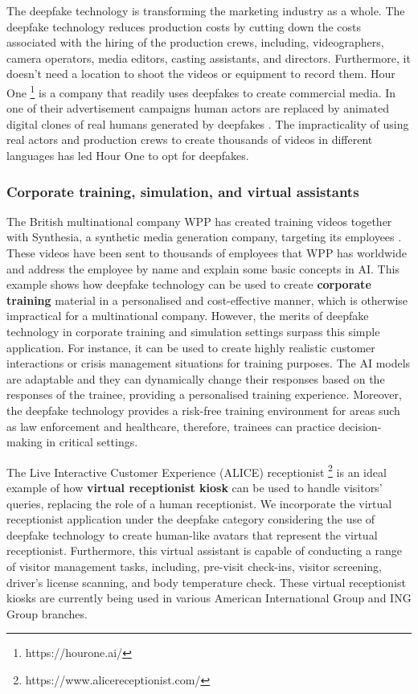 The deepfake technology is transforming the marketing industry as a whole. The deepfake technology reduces production costs by cutting down the costs associated with the hiring of the production crews, including, videographers, camera operators, media editors, casting assistants, and directors. Furthermore, it doesn't need a location to shoot the videos or equipment to record them. Hour One \footnote{https://hourone.ai/} is a company that readily uses deepfakes to create commercial media. In one of their advertisement campaigns human actors are replaced by animated digital clones of real humans generated by deepfakes \cite{deepfaketechnologyreview}. The impracticality of using real actors and production crews to create thousands of videos in different languages has led Hour One to opt for deepfakes.

\subsubsection{Corporate training, simulation, and virtual assistants}

The British multinational company WPP has created training videos together with Synthesia, a synthetic media generation company, targeting its employees \cite{deepfakewired}. These videos have been sent to thousands of employees that WPP has worldwide and address the employee by name and explain some basic concepts in AI. This example shows how deepfake technology can be used to create \textbf{corporate training} material in a personalised and cost-effective manner, which is otherwise impractical for a multinational company. However, the merits of deepfake technology in corporate training and simulation settings surpass this simple application. For instance, it can be used to create highly realistic customer interactions or crisis management situations for training purposes. The AI models are adaptable and they can dynamically change their responses based on the responses of the trainee, providing a personalised training experience. Moreover, the deepfake technology provides a risk-free training environment for areas such as law enforcement and healthcare, therefore, trainees can practice decision-making in critical settings.  

The Live Interactive Customer Experience (ALICE) receptionist \footnote{https://www.alicereceptionist.com/} is an ideal example of how \textbf{virtual receptionist kiosk} can be used to handle visitors' queries, replacing the role of a human receptionist. We incorporate the virtual receptionist application under the deepfake category considering the use of deepfake technology to create human-like avatars that represent the virtual receptionist. Furthermore, this virtual assistant is capable of conducting a range of visitor management tasks, including, pre-visit check-ins, visitor screening, driver's license scanning, and body temperature check. These virtual receptionist kiosks are currently being used in various American International Group and ING Group branches.


